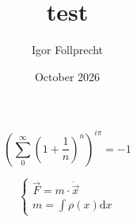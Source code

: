 \documentclass{beamer}
\title{test}
\author{Igor Follprecht}
\date{October 2026}
\begin{document}
    \begin{frame}
$$ \left( \sum\limits_0^\infty \left(1+\frac{1}{n}\right)^n \right)^{i\pi}=-1 $$
    \end{frame}
    \begin{frame}
$$ \begin{cases}
    \vec{F}=m\cdot\ddot{\vec{x}}\\m=\int\rho(x)\text{d}x
\end{cases}$$
\end{frame}
\begin{frame}
\end{frame}
\end{document}
